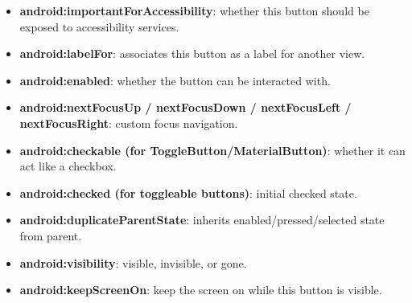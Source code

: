 \documentclass{report}
\begin{document}
\begin{itemize}
\begin{itemize}
                \item \textbf{android:importantForAccessibility}: whether this button should be exposed to accessibility services.
                \item \textbf{android:labelFor}: associates this button as a label for another view.
                \item \textbf{android:enabled}: whether the button can be interacted with.
                \item \textbf{android:nextFocusUp / nextFocusDown / nextFocusLeft / nextFocusRight}: custom focus navigation.
                \item \textbf{android:checkable (for ToggleButton/MaterialButton)}: whether it can act like a checkbox.
                \item \textbf{android:checked (for toggleable buttons)}: initial checked state.
                \item \textbf{android:duplicateParentState}: inherits enabled/pressed/selected state from parent.
                \item \textbf{android:visibility}: visible, invisible, or gone.
                \item \textbf{android:keepScreenOn}: keep the screen on while this button is visible.
            \end{itemize}
    \end{itemize}

    \pagebreak 
\end{document}

